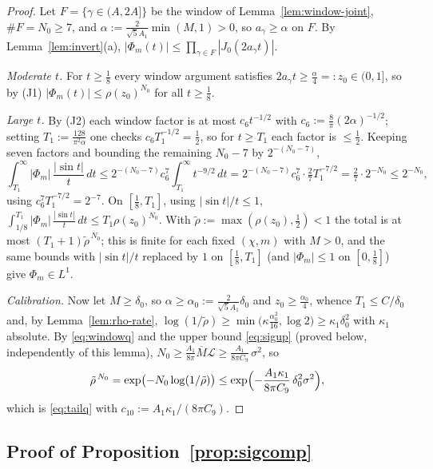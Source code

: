 \documentclass[11pt]{article}
\begin{document}
\begin{proof}
Let $F=\{\gamma\in(A,2A]\}$ be the window of
Lemma~\ref{lem:window-joint}, $\#F=N_0\ge7$, and
$\alpha:=\tfrac{2}{\sqrt5A_1}\min(M,1)>0$, so $a_\gamma\ge\alpha$ on
$F$. By Lemma~\ref{lem:invert}(a),
$|\Phi_m(t)|\le\prod_{\gamma\in F}|J_0(2a_\gamma t)|$.

\emph{Moderate $t$.} For $t\ge\tfrac18$ every window argument satisfies
$2a_\gamma t\ge\tfrac{\alpha}4=:z_0\in(0,1]$, so by (J1)
$|\Phi_m(t)|\le\rho(z_0)^{N_0}$ for all $t\ge\tfrac18$.

\emph{Large $t$.} By (J2) each window factor is at most
$c_6t^{-1/2}$ with $c_6:=\tfrac8\pi(2\alpha)^{-1/2}$; setting
$T_1:=\tfrac{128}{\pi^2\alpha}$ one checks $c_6T_1^{-1/2}=\tfrac12$,
so for $t\ge T_1$ each factor is $\le\tfrac12$. Keeping seven factors
and bounding the remaining $N_0-7$ by $2^{-(N_0-7)}$,
\[
\int_{T_1}^\infty|\Phi_m|\,\frac{|\sin t|}{t}\,dt
\le2^{-(N_0-7)}c_6^{7}\int_{T_1}^\infty t^{-9/2}\,dt
=2^{-(N_0-7)}c_6^{7}\cdot\tfrac27T_1^{-7/2}
=\tfrac27\cdot2^{-N_0}\le2^{-N_0},
\]
using $c_6^{7}T_1^{-7/2}=2^{-7}$. On $[\tfrac18,T_1]$, using
$|\sin t|/t\le1$,
$\int_{1/8}^{T_1}|\Phi_m|\,\frac{|\sin t|}t\,dt\le T_1\rho(z_0)^{N_0}$.
With $\tilde\rho:=\max(\rho(z_0),\tfrac12)<1$ the total is at most
$(T_1+1)\tilde\rho^{\,N_0}$; this is finite for each fixed $(\chi,m)$
with $M>0$, and the same bounds with $|\sin t|/t$ replaced by $1$ on
$[\tfrac18,T_1]$ (and $|\Phi_m|\le1$ on $[0,\tfrac18]$) give
$\Phi_m\in L^1$.

\emph{Calibration.} Now let $M\ge\delta_0$, so
$\alpha\ge\alpha_0:=\tfrac{2}{\sqrt5A_1}\delta_0$ and
$z_0\ge\tfrac{\alpha_0}4$, whence $T_1\le C/\delta_0$ and, by
Lemma~\ref{lem:rho-rate},
$\log(1/\tilde\rho)\ge\min\bigl(\kappa\tfrac{\alpha_0^2}{16},\log2\bigr)
\ge\kappa_1\delta_0^{2}$ with $\kappa_1$ absolute. By
\eqref{eq:windowq} and the upper bound \eqref{eq:sigup} (proved below,
independently of this lemma),
$N_0\ge\tfrac{A_1}{8\pi}\overline M\mathcal L
\ge\tfrac{A_1}{8\pi C_9}\,\sigma^{2}$, so
\[
\tilde\rho^{\,N_0}
=\exp\bigl(-N_0\log(1/\tilde\rho)\bigr)
\le\exp\Bigl(-\frac{A_1\kappa_1}{8\pi C_9}\,\delta_0^{2}\sigma^{2}\Bigr),
\]
which is \eqref{eq:tailq} with $c_{10}:=A_1\kappa_1/(8\pi C_9)$.
\end{proof}

\subsection*{Proof of Proposition~\ref{prop:sigcomp}}
\end{document}
